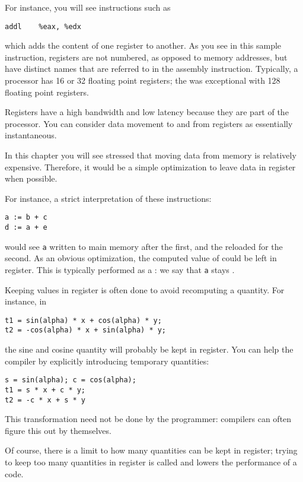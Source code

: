 For instance, you will see instructions such as
\begin{lstlisting}[language=verbatim]
addl	%eax, %edx
\end{lstlisting}
which adds the content of one register to
another. As you see in this sample instruction, registers are not
numbered, as opposed to memory addresses,
but have distinct names that are referred to in
the assembly instruction. Typically, a processor has 16 or 32
floating point registers; the  was
exceptional with 128 floating point registers.

Registers have a high bandwidth and low latency because they
are part of the processor. You can consider data movement to and from
registers as essentially instantaneous.

In this chapter you will see stressed that moving data from memory is
relatively expensive. Therefore, it would be a simple optimization to
leave data in register when possible.

For instance, a strict interpretation of these instructions:
\begin{lstlisting}
a := b + c
d := a + e
\end{lstlisting}
would see \lstinline{a} written to main memory after the first,
and the reloaded for the second.
As an obvious optimization, the computed value of  could be left in register.
This is typically performed as a
:
we say that \lstinline{a} stays .

Keeping values in register is often done to avoid recomputing a
quantity. For instance, in 
\begin{lstlisting}
t1 = sin(alpha) * x + cos(alpha) * y;
t2 = -cos(alpha) * x + sin(alpha) * y;
\end{lstlisting}
the sine and cosine quantity will probably be kept in register. You
can help the compiler by explicitly introducing temporary quantities:
\begin{lstlisting}
s = sin(alpha); c = cos(alpha);
t1 = s * x + c * y;
t2 = -c * x + s * y
\end{lstlisting}
This transformation need not be done by the programmer:
compilers can often figure this out by themselves.

Of course, there is a limit to how many quantities can be kept in
register; trying to keep too many quantities in register is called
 and lowers the performance of a code.

